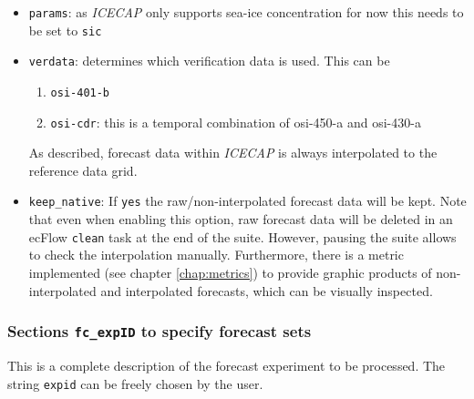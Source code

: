 \documentclass[DIV=10, parskip=full]{scrreprt}
\newcommand{\ice}{\textit{ICECAP}\xspace}
\begin{document}
\begin{itemize}
 \item \texttt{params}: as \ice only supports sea-ice concentration for now this needs to be set to \texttt{sic}
 \item \texttt{verdata}: determines which verification data is used. This can be 
 \begin{enumerate}
 	\item \texttt{osi-401-b}
 	\item \texttt{osi-cdr}: this is a temporal combination of osi-450-a and osi-430-a
 \end{enumerate}
As described, forecast data within \ice is always interpolated to the reference data grid. 
 

  \item \texttt{keep\_native}: If \texttt{yes} the raw/non-interpolated forecast data will be kept. Note that even when enabling this option, raw forecast data will be deleted in an ecFlow \texttt{clean} task at the end of the suite. However, pausing the suite allows to check the interpolation manually. Furthermore, there is a metric implemented (see chapter \ref{chap:metrics}) to provide graphic products of non-interpolated and interpolated forecasts, which can be visually inspected. 
\end{itemize}

\subsubsection{Sections \texttt{fc\_expID} to specify forecast sets} \label{sec:config_fcsets}
This is a complete description of the forecast experiment to be processed. The string \texttt{expid} can be freely chosen by the user.
\end{document}
